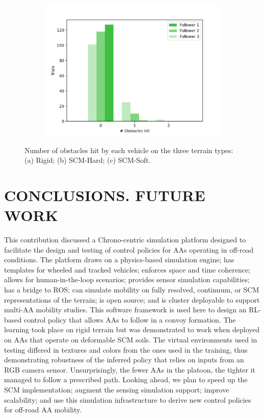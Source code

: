 \documentclass[12pt,twocolumn]{article}
\begin{document}
\begin{figure}
\begin{subfigure}{0.33\textwidth}
        \includegraphics[width=\linewidth]{Figs/StatisticalAnalysis/soft_histogram.png}
        \caption{} \label{fig:softhistogram}
    \end{subfigure}%
    \caption{Number of obstacles hit by each vehicle on the three terrain types: (a) Rigid; (b) SCM-Hard; (c) SCM-Soft.}   
    \label{fig:obstacleshit}
\end{figure}


\section{CONCLUSIONS. FUTURE WORK}\label{s:conclusion}
This contribution discussed a Chrono-centric simulation platform designed to facilitate the design and testing of control policies for AAs operating in off-road conditions. The platform draws on a physics-based simulation engine; has templates for wheeled and tracked vehicles; enforces space and time coherence; allows for human-in-the-loop scenarios; provides sensor simulation capabilities; has a bridge to ROS; can simulate mobility on fully resolved, continuum, or SCM representations of the terrain; is open source; and is cluster deployable to support multi-AA mobility studies. This software framework is used here to design an RL-based control policy that allows AAs to follow in a convoy formation. The learning took place on rigid terrain but was demonstrated to work when deployed on AAs that operate on deformable SCM soils. The virtual environments used in testing differed in textures and colors from the ones used in the training, thus demonstrating robustness of the inferred policy that relies on inputs from an RGB camera sensor. Unsurprisingly, the fewer AAs in the platoon, the tighter it managed to follow a prescribed path. Looking ahead, we plan to speed up the SCM implementation; augment the sensing simulation support; improve scalability; and use this simulation infrastructure to derive new control policies for off-road AA mobility. 
\end{document}

